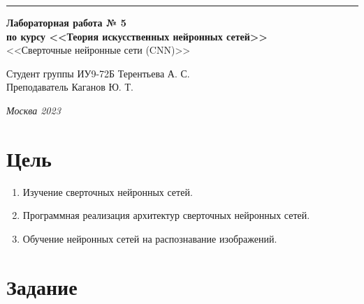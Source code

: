 \documentclass[a4paper, 14pt]{extarticle}
\begin{document}
\begin{titlepage}
\vspace*{-16pt}
\hspace{30pt}\rule{0.866\textwidth}{0.4pt}
  
\vspace{11em}

\begin{center}
\Large {\bf Лабораторная работа № 5} \\ 
\large {\bf по курсу <<Теория искусственных нейронных сетей>>} \\
\large <<Сверточные нейронные сети (CNN)>> 
\end{center}\normalsize

\vspace{8em}


\begin{flushright}
  {Студент группы ИУ9-72Б Терентьева А. С. \hspace*{15pt}\\ 
  \vspace{2ex}
  Преподаватель Каганов Ю. Т.\hspace*{15pt}}
\end{flushright}

\bigskip

\vfill
 

\begin{center}
\textsl{Москва 2023}
\end{center}
\end{titlepage}

\renewcommand{\ttdefault}{pcr}

\setlength{\tabcolsep}{3pt}
\newpage
\setcounter{page}{2}

\section{Цель}\label{Sect::purpose}
\begin{enumerate}
\item Изучение сверточных нейронных сетей.
\item Программная реализация архитектур сверточных нейронных сетей.
\item Обучение нейронных сетей на распознавание изображений.
\end{enumerate}

\section{Задание}\label{Sect::task}
\end{document}
